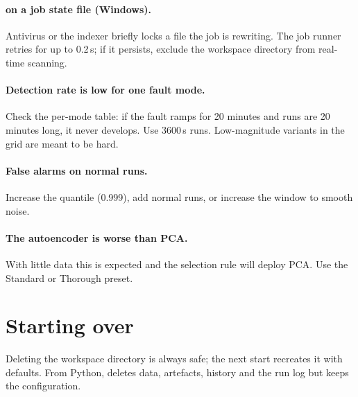 \paragraph{ on a job state file (Windows).} Antivirus or
the indexer briefly locks a file the job is rewriting. The job runner retries
for up to 0.2\,s; if it persists, exclude the workspace directory from
real-time scanning.

\paragraph{Detection rate is low for one fault mode.} Check the per-mode
table: if the fault ramps for 20 minutes and runs are 20 minutes long, it never
develops. Use 3600\,s runs. Low-magnitude variants in the grid are meant to be
hard.

\paragraph{False alarms on normal runs.} Increase the quantile (0.999), add
normal runs, or increase the window to smooth noise.

\paragraph{The autoencoder is worse than PCA.} With little data this is
expected and the selection rule will deploy PCA. Use the Standard or Thorough
preset.

\section{Starting over}

Deleting the workspace directory is always safe; the next start recreates it
with defaults. From Python,  deletes data,
artefacts, history and the run log but keeps the configuration.
